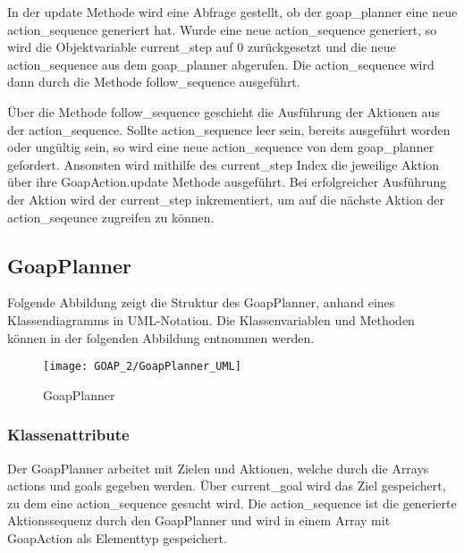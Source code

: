 

In der update Methode wird eine Abfrage gestellt, ob der goap\_planner eine neue action\_sequence generiert hat. Wurde eine neue action\_sequence generiert, so wird die Objektvariable current\_step auf $0$ zurückgesetzt und die neue action\_sequence aus dem goap\_planner abgerufen. Die action\_sequence wird dann durch die Methode follow\_sequence ausgeführt.

Über die Methode follow\_sequence geschieht die Ausführung der Aktionen aus der action\_sequence. Sollte action\_sequence leer sein, bereits ausgeführt worden oder ungültig sein, so wird eine neue action\_sequence von dem goap\_planner gefordert. Ansonsten wird mithilfe des current\_step Index die jeweilige Aktion über ihre GoapAction.update Methode ausgeführt. Bei erfolgreicher Ausführung der Aktion wird der current\_step inkrementiert, um auf die nächste Aktion der action\_seqeunce zugreifen zu können.





\subsection{GoapPlanner}

Folgende Abbildung zeigt die Struktur des GoapPlanner, anhand eines Klassendiagramms in UML-Notation. Die Klassenvariablen und Methoden können in der folgenden Abbildung entnommen werden.

\begin{figure}[h]
  \centering
  \texttt{[image: GOAP\_2/GoapPlanner\_UML]}
	\captionsetup{justification=justified, format=plain}
  \caption{GoapPlanner}
  \label{GoapPlanner}
\end{figure}


\subsubsection{Klassenattribute}

Der GoapPlanner arbeitet mit Zielen und Aktionen, welche durch die Arrays actions und goals gegeben werden. Über current\_goal wird das Ziel gespeichert, zu dem eine action\_sequence gesucht wird. Die action\_sequence ist die generierte Aktionssequenz durch den GoapPlanner und wird in einem Array mit GoapAction als Elementtyp gespeichert. 

